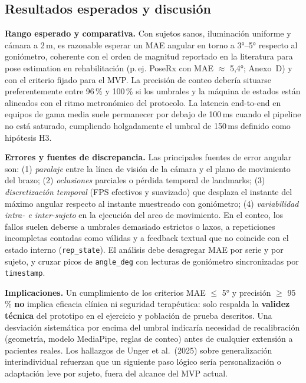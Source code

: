 \documentclass[11pt,a4paper]{article}
\begin{document}
\subsection{Resultados esperados y discusión}
\textbf{Rango esperado y comparativa.} Con sujetos sanos, iluminación uniforme y cámara a 2\,m, es razonable esperar un MAE angular en torno a 3°--5° respecto al goniómetro, coherente con el orden de magnitud reportado en la literatura para pose estimation en rehabilitación (p.\,ej. PoseRx con MAE $\approx$ 5,4°; Anexo~D) y con el criterio fijado para el MVP. La precisión de conteo debería situarse preferentemente entre 96\,\% y 100\,\% si los umbrales y la máquina de estados están alineados con el ritmo metronómico del protocolo. La latencia end-to-end en equipos de gama media suele permanecer por debajo de 100\,ms cuando el pipeline no está saturado, cumpliendo holgadamente el umbral de 150\,ms definido como hipótesis H3.

\textbf{Errores y fuentes de discrepancia.} Las principales fuentes de error angular son: (1) \textit{paralaje} entre la línea de visión de la cámara y el plano de movimiento del brazo; (2) \textit{oclusiones} parciales o pérdida temporal de landmarks; (3) \textit{discretización temporal} (FPS efectivos y suavizado) que desplaza el instante del máximo angular respecto al instante muestreado con goniómetro; (4) \textit{variabilidad intra- e inter-sujeto} en la ejecución del arco de movimiento. En el conteo, los fallos suelen deberse a umbrales demasiado estrictos o laxos, a repeticiones incompletas contadas como válidas y a feedback textual que no coincide con el estado interno (\texttt{rep\_state}). El análisis debe desagregar MAE por serie y por sujeto, y cruzar picos de \texttt{angle\_deg} con lecturas de goniómetro sincronizadas por \texttt{timestamp}.

\textbf{Implicaciones.} Un cumplimiento de los criterios MAE $\leq$ 5° y precisión $\geq$ 95\,\% \textbf{no} implica eficacia clínica ni seguridad terapéutica: solo respalda la \textbf{validez técnica} del prototipo en el ejercicio y población de prueba descritos. Una desviación sistemática por encima del umbral indicaría necesidad de recalibración (geometría, modelo MediaPipe, reglas de conteo) antes de cualquier extensión a pacientes reales. Los hallazgos de Unger et al.\ (2025) sobre generalización interindividual refuerzan que un siguiente paso lógico sería personalización o adaptación leve por sujeto, fuera del alcance del MVP actual.

\clearpage
{}
\end{document}

